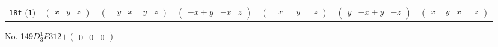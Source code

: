 \documentclass[fleqn,9pt,landscape]{jsarticle}
\begin{document}
\begin{center}
\begin{longtable}{ccccccc}
{\tt 18f} ({\tt 1}) & $ \begin{pmatrix} x & y & z \end{pmatrix} $ & $ \begin{pmatrix} - y & x - y & z \end{pmatrix} $ & $ \begin{pmatrix} - x + y & - x & z \end{pmatrix} $ & $ \begin{pmatrix} - x & - y & - z \end{pmatrix} $ & $ \begin{pmatrix} y & - x + y & - z \end{pmatrix} $ & $ \begin{pmatrix} x - y & x & - z \end{pmatrix} $ \\
\end{longtable}
\end{center}
\newpage
No. 149\quad$D_{3}^{1}$\quad$P312$\quad[ trigonal ]\quad$+\begin{pmatrix} 0 & 0 & 0 \end{pmatrix}$
\end{document}
